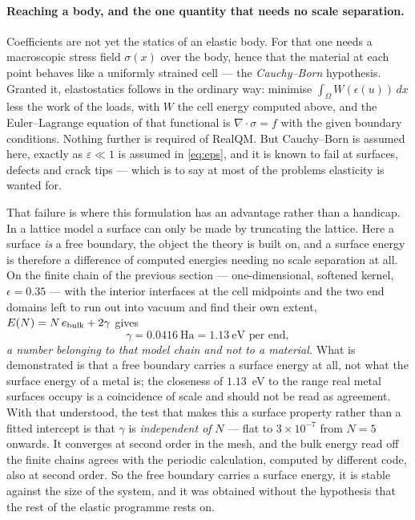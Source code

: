 \documentclass[11pt]{article}
\newcommand{\grad}{\nabla}
\begin{document}
\paragraph{Reaching a body, and the one quantity that needs no scale separation.} Coefficients are
not yet the statics of an elastic body. For that one needs a macroscopic stress field $\sigma(x)$
over the body, hence that the material at each point behaves like a uniformly strained cell --- the
\emph{Cauchy--Born} hypothesis. Granted it, elastostatics follows in the ordinary way: minimise
$\int_\Omega W(\epsilon(u))\,dx$ less the work of the loads, with $W$ the cell energy computed above,
and the Euler--Lagrange equation of that functional is $\grad\cdot\sigma=f$ with the given boundary
conditions. Nothing further is required of RealQM. But Cauchy--Born is assumed here, exactly as
$\varepsilon\ll1$ is assumed in \eqref{eq:eps}, and it is known to fail at surfaces, defects and
crack tips --- which is to say at most of the problems elasticity is wanted for.

That failure is where this formulation has an advantage rather than a handicap. In a lattice model a
surface can only be made by truncating the lattice. Here a surface \emph{is} a free boundary, the
object the theory is built on, and a surface energy is therefore a difference of computed energies
needing no scale separation at all. On the finite chain of the previous section --- one-dimensional,
softened kernel, $\epsilon=0.35$ --- with the interior interfaces at the cell midpoints and the two
end domains left to run out into vacuum and find their own extent, $E(N)=N\,e_{\rm bulk}+2\gamma$
gives
\[
\gamma = 0.0416~\text{Ha} = 1.13~\text{eV per end},
\]
\emph{a number belonging to that model chain and not to a material.} What is demonstrated is that a
free boundary carries a surface energy at all, not what the surface energy of a metal is; the
closeness of $1.13$~eV to the range real metal surfaces occupy is a coincidence of scale and should
not be read as agreement. With that understood, the test that makes this a surface property rather than a fitted intercept is that $\gamma$ is
\emph{independent of} $N$ --- flat to $3\times10^{-7}$ from $N=5$ onwards. It converges at second
order in the mesh, and the bulk energy read off the finite chains agrees with the periodic
calculation, computed by different code, also at second order. So the free boundary carries a
surface energy, it is stable against the size of the system, and it was obtained without the
hypothesis that the rest of the elastic programme rests on.
\end{document}
